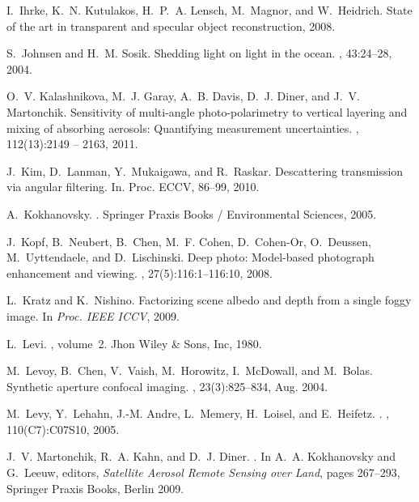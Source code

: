 \documentclass[10pt,twocolumn,letterpaper]{article}
\begin{document}
{\begin{thebibliography}{10}
I.~Ihrke, K.~N. Kutulakos, H.~P.~A. Lensch, M.~Magnor, and W.~Heidrich.
\newblock State of the art in transparent and specular object reconstruction,
  2008.

S.~Johnsen and H.~M. Sosik.
\newblock Shedding light on light in the ocean.
, 43:24--28, 2004.

O.~V. Kalashnikova, M.~J. Garay, A.~B. Davis, D.~J. Diner, and J.~V.
  Martonchik.
\newblock Sensitivity of multi-angle photo-polarimetry to vertical layering and
  mixing of absorbing aerosols: Quantifying measurement uncertainties.
,
  112(13):2149 -- 2163, 2011.

J.~Kim, D.~Lanman, Y.~Mukaigawa, and R.~Raskar.
\newblock Descattering transmission via angular filtering.
\newblock In. Proc. ECCV, 86--99, 2010.

A.~Kokhanovsky.
.
\newblock Springer Praxis Books / Environmental Sciences, 2005.

J.~Kopf, B.~Neubert, B.~Chen, M.~F. Cohen, D.~Cohen-Or, O.~Deussen,
  M.~Uyttendaele, and D.~Lischinski.
\newblock Deep photo: Model-based photograph enhancement and viewing.
, 27(5):116:1--116:10, 2008.

L.~Kratz and K.~Nishino.
\newblock Factorizing scene albedo and depth from a single foggy image.
\newblock In {\em Proc. IEEE ICCV}, 2009.

L.~Levi.
, volume~2.
\newblock Jhon Wiley \& Sons, Inc, 1980.

M.~Levoy, B.~Chen, V.~Vaish, M.~Horowitz, I.~McDowall, and M.~Bolas.
\newblock Synthetic aperture confocal imaging.
, 23(3):825--834, Aug. 2004.

M.~Levy, Y.~Lehahn, J.-M. Andre, L.~Memery, H.~Loisel, and E.~Heifetz.
.
, 110(C7):C07S10, 2005.

J.~V. Martonchik, R.~A. Kahn, and D.~J. Diner.
.
\newblock In A.~A. Kokhanovsky and G.~Leeuw, editors, {\em Satellite Aerosol
  Remote Sensing over Land}, pages 267--293, Springer Praxis Books,
  Berlin 2009.


\end{thebibliography}}
\end{document}
